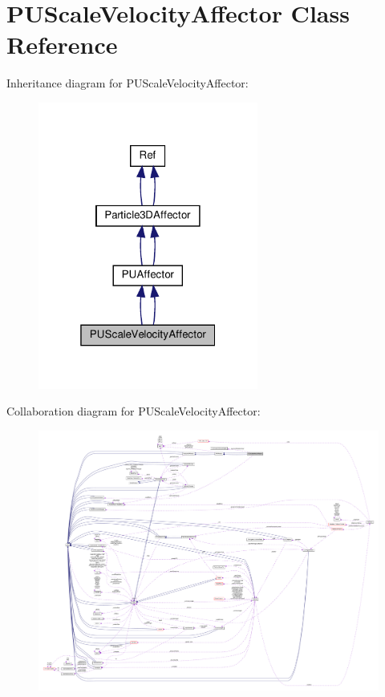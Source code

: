 \hypertarget{classPUScaleVelocityAffector}{}\section{P\+U\+Scale\+Velocity\+Affector Class Reference}
\label{classPUScaleVelocityAffector}


Inheritance diagram for P\+U\+Scale\+Velocity\+Affector\+:
\nopagebreak
\begin{figure}[H]
\begin{center}
\leavevmode
\includegraphics[width=205pt]{classPUScaleVelocityAffector__inherit__graph}
\end{center}
\end{figure}


Collaboration diagram for P\+U\+Scale\+Velocity\+Affector\+:
\nopagebreak
\begin{figure}[H]
\begin{center}
\leavevmode
\includegraphics[width=350pt]{classPUScaleVelocityAffector__coll__graph}
\end{center}
\end{figure}
